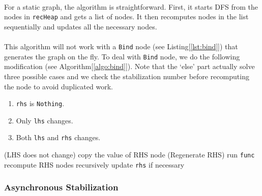 \documentclass[a4paper, twocolumn]{article}
\newcommand{\code}{\texttt} %
\begin{document}
\paragraph{} For a static graph, the algorithm is straightforward. First, it starts DFS from the nodes in \code{recHeap} and gets a list of nodes. It then recomputes nodes in the list sequentially and updates all the necessary nodes. 

\paragraph{} This algorithm will not work with a \code{Bind} node (see Listing[\ref{lst:bind}]) that generates the graph on the fly. To deal with \code{Bind} node, we do the following modification (see Algorithm[\ref{algo:bind}]). Note that the `else' part actually solve three possible cases and we check the stabilization number before recomputing the node to avoid duplicated work.

\begin{enumerate}
  \item \code{rhs} is \code{Nothing}.
  \item Only \code{lhs} changes.
  \item Both \code{lhs} and \code{rhs} changes.
\end{enumerate}

\begin{algorithm}
  \caption{Recompute \code{Bind} node}
  \label{algo:bind}
   {
    (LHS does not change)\;
    copy the value of RHS node\;
   } {
     (Regenerate RHS)\;
     run \code{func}\;
     recompute RHS nodes recursively\;
     update \code{rhs} if necessary\;
   }
\end{algorithm}

\subsubsection{Asynchronous Stabilization}
\end{document}
